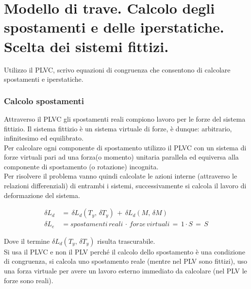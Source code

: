 \section{Modello di trave. Calcolo degli spostamenti e delle iperstatiche. Scelta dei sistemi fittizi.}

Utilizzo il PLVC, scrivo equazioni di congruenza che consentono di calcolare spostamenti e iperstatiche.
\subsubsection*{Calcolo spostamenti}
Attraverso il PLVC gli spostamenti reali compiono lavoro per le forze del sistema fittizio.
Il sistema fittizio è un sistema virtuale di forze, è dunque: arbitrario, infinitesimo ed equilibrato.\\
Per calcolare ogni componente di spostamento utilizzo il PLVC con un sistema di forze virtuali pari ad una forza(o momento) unitaria parallela ed equiversa alla componente di spostamento (o rotazione) incognita.\\
Per risolvere il problema vanno quindi calcolate le azioni interne (attraverso le relazioni differenziali) di entrambi i sistemi, successivamente si calcola il lavoro di deformazione del sistema.

\begin{align*}
    \delta L_d \,&=\, \delta L_d(T_y, \, \delta T_y)\,+\,\delta L_d(M, \, \delta M)\\
    \delta L_e &= spostamenti\,reali \, \cdot\, forze\, virtuali \,= \, 1\cdot S \,=\, S
\end{align*}

Dove il termine $ \delta L_d(T_y, \, \delta T_y)$ risulta trascurabile.\\

Si usa il PLVC e non il PLV perché il calcolo dello spostamento è una condizione di congruenza, si calcola uno spostamento reale (mentre nel PLV sono fittizi), uso una forza virtuale per avere un lavoro esterno immediato da calcolare (nel PLV le forze sono reali).

